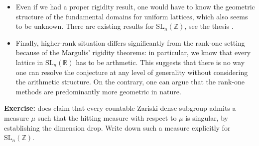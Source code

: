\documentclass[11pt]{amsart}
\theoremstyle{definition}
\begin{document}
\begin{itemize}
		\item Even if we had a proper rigidity result, one would have to know the geometric structure of the fundamental domains for uniform lattices, which also seems to be unknown. There are existing results for $\text{SL}_n(\mathbb{Z})$, see the thesis \cite{gisele}.
		\item Finally, higher-rank situation differs significantly from the rank-one setting because of the Margulis' rigidity theorems: in particular, we know that every lattice in $\text{SL}_n(\mathbb{R})$ has to be arthmetic. This suggests that there is no way one can resolve the conjecture at any level of generality without considering the arithmetic structure. On the contrary, one can argue that the rank-one methods are predominantly more geometric in nature.
	\end{itemize}
	
	\textbf{Exercise:} \cite{kaimanovich2011matrix} does claim that every countable Zariski-dense subgroup admits a measure $\mu$ such that the hitting measure with respect to $\mu$ is singular, by establishing the dimension drop. Write down such a measure explicitly for $\text{SL}_n(\mathbb{Z})$.
	
	
	
	\printbibliography
	
\end{document}
